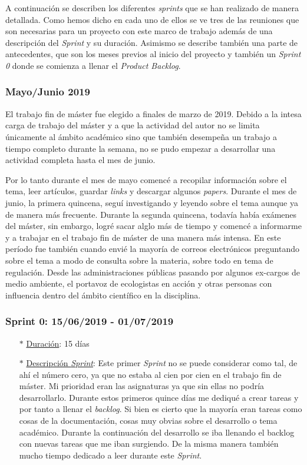 A continuación se describen los diferentes \emph{sprints} que se han realizado de manera detallada. Como hemos dicho en cada uno de ellos se ve tres de las reuniones que son necesarias para un proyecto con este marco de trabajo además de una descripción del \textit{Sprint} y su duración. Asimismo se describe también una parte de antecedentes, que son los meses previos al inicio del proyecto y también un \textit{Sprint 0} donde se comienza a llenar el \textit{Product Backlog}.

\subsubsection{Mayo/Junio 2019}\label{previo}
El trabajo fin de máster fue elegido a finales de marzo de 2019. Debido a la intesa carga de trabajo del máster y a que la actividad del autor no se limita únicamente al ámbito académico sino que también desempeña un trabajo a tiempo completo durante la semana, no se pudo empezar a desarrollar una actividad completa hasta el mes de junio. 

Por lo tanto durante el mes de mayo comencé a recopilar información sobre el tema, leer artículos, guardar \textit{links} y descargar algunos \textit{papers}. Durante el mes de junio, la primera quincena, seguí investigando y leyendo sobre el tema aunque ya de manera más frecuente. Durante la segunda quincena, todavía había exámenes del máster, sin embargo, logré sacar alglo más de tiempo y comencé a informarme y a trabajar en el trabajo fin de máster de una manera más intensa. En este período fue también cuando envié la mayoría de correos electrónicos preguntando sobre el tema a modo de consulta sobre la materia, sobre todo en tema de regulación. Desde las administraciones públicas pasando por algunos ex-cargos de medio ambiente, el portavoz de ecologistas en acción y otras personas con influencia dentro del ámbito científico en la disciplina.


\subsubsection{Sprint 0: 15/06/2019 - 01/07/2019}\label{sprint0}
\begin{itemize}
	\item[$\ast$] \underline{Duración}:  15 días
	\item[$\ast$] \underline{Descripción \textit{Sprint}}: Este primer \textit{Sprint} no se puede considerar como tal, de ahí el número cero, ya que no estaba al cien por cien en el trabajo fin de máster. Mi prioridad eran las asignaturas ya que sin ellas no podría desarrollarlo. Durante estos primeros quince días me dediqué a crear tareas y por tanto a llenar el \textit{backlog}. Si bien es cierto que la mayoría eran tareas como cosas de la documentación, cosas muy obvias sobre el desarrollo o tema académico. Durante la continuación del desarrollo se iba llenando el backlog con nuevas tareas que me iban surgiendo. De la misma manera también mucho tiempo dedicado a leer durante este \textit{Sprint}.
\end{itemize}
